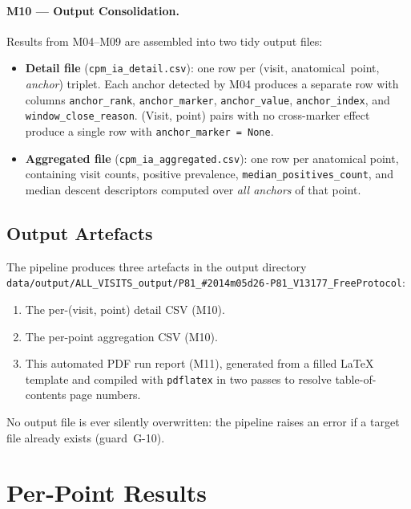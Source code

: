 \documentclass[a4paper,11pt]{article}
\begin{document}
\paragraph{M10 --- Output Consolidation.}
Results from M04--M09 are assembled into two tidy output files:
\begin{itemize}
  \item \textbf{Detail file} (\texttt{cpm\_ia\_detail.csv}): one row per
        (visit, anatomical~point, \emph{anchor}) triplet. Each anchor detected by M04
        produces a separate row with columns \texttt{anchor\_rank},
        \texttt{anchor\_marker}, \texttt{anchor\_value}, \texttt{anchor\_index},
        and \texttt{window\_close\_reason}.
        (Visit, point) pairs with no cross-marker effect produce a single row with
        \texttt{anchor\_marker = None}.
  \item \textbf{Aggregated file} (\texttt{cpm\_ia\_aggregated.csv}): one row per
        anatomical point, containing visit counts, positive prevalence,
        \texttt{median\_positives\_count}, and median descent descriptors computed over
        \emph{all anchors} of that point.
\end{itemize}

\subsection{Output Artefacts}

The pipeline produces three artefacts in the output directory \texttt{data/output/ALL\_VISITS\_output/P81\_\#2014m05d26-P81\_V13177\_FreeProtocol}:
\begin{enumerate}
  \item The per-(visit, point) detail CSV (M10).
  \item The per-point aggregation CSV (M10).
  \item This automated PDF run report (M11), generated from a filled \LaTeX{} template
        and compiled with \texttt{pdflatex} in two passes to resolve table-of-contents
        page numbers.
\end{enumerate}
No output file is ever silently overwritten: the pipeline raises an error if a target
file already exists (guard~G-10).

\section{Per-Point Results}
\end{document}
